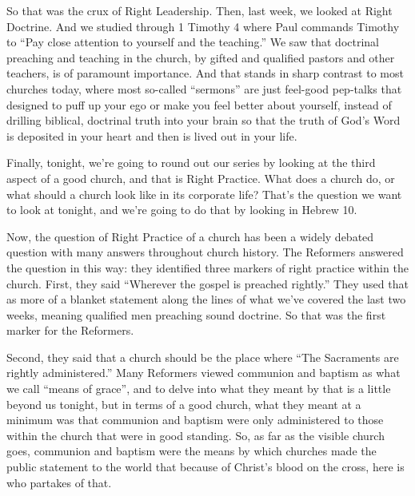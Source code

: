 \documentclass[letterpaper, 12pt]{article}
\begin{document}
    So that was the crux of Right Leadership. Then, last week, we looked
    at Right Doctrine. And we studied through 1 Timothy 4 where Paul
    commands Timothy to ``Pay close attention to yourself and the
    teaching.'' We saw that doctrinal preaching and teaching in the
    church, by gifted and qualified pastors and other teachers, is of
    paramount importance. And that stands in sharp contrast to most
    churches today, where most so-called ``sermons'' are just feel-good
    pep-talks that designed to puff up your ego or make you feel better
    about yourself, instead of drilling biblical, doctrinal truth into
    your brain so that the truth of God's Word is deposited in your
    heart and then is lived out in your life.

    Finally, tonight, we're going to round out our series by looking at
    the third aspect of a good church, and that is Right Practice. What
    does a church do, or what should a church look like in its corporate
    life? That's the question we want to look at tonight, and we're
    going to do that by looking in Hebrew 10.

    Now, the question of Right Practice of a church has been a widely
    debated question with many answers throughout church history. The
    Reformers answered the question in this way: they identified three
    markers of right practice within the church. First, they said
    ``Wherever the gospel is preached rightly.'' They used that as more
    of a blanket statement along the lines of what we've covered the
    last two weeks, meaning qualified men preaching sound doctrine. So
    that was the first marker for the Reformers. 

    Second, they said that
    a church should be the place where ``The Sacraments are rightly
    administered.'' Many Reformers viewed communion and baptism as what
    we call ``means of grace'', and to delve into what they meant by
    that is a little beyond us tonight, but in terms of a good church,
    what they meant at a minimum was that communion and baptism were
    only administered to those within the church that were in good
    standing. So, as far as the visible church goes, communion and
    baptism were the means by which churches made the public statement
    to the world that because of Christ's blood on the cross, here is
    who partakes of that. 
\end{document}
